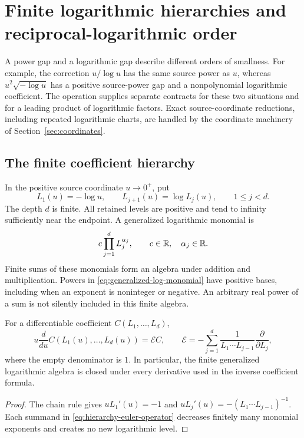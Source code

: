 \section{Finite logarithmic hierarchies and reciprocal-logarithmic order}
\label{sec:logarithmic-scales}

A power gap and a logarithmic gap describe different orders of smallness.
For example, the correction $u/\log u$ has the same source power as $u$,
whereas $u^2\sqrt{-\log u}$ has a positive source-power gap and a
nonpolynomial logarithmic coefficient. The operation
 supplies separate contracts for these
two situations and for a leading product of logarithmic factors. Exact
source-coordinate reductions, including repeated logarithmic charts, are
handled by the coordinate machinery of Section~\ref{sec:coordinates}.

\subsection{The finite coefficient hierarchy}

In the positive source coordinate $u\to0^+$, put
\begin{equation}
 L_1(u)=-\log u,\qquad L_{j+1}(u)=\log L_j(u),
 \qquad 1\le j<d.
 \label{eq:logarithmic-hierarchy}
\end{equation}
The depth $d$ is finite. All retained levels are positive and tend to
infinity sufficiently near the endpoint. A generalized logarithmic
monomial is
\begin{equation}
 c\prod_{j=1}^d L_j^{\alpha_j},\qquad
 c\in\mathbb R,\quad \alpha_j\in\mathbb R.
 \label{eq:generalized-log-monomial}
\end{equation}
Finite sums of these monomials form an algebra under addition and
multiplication. Powers in \eqref{eq:generalized-log-monomial} have positive
bases, including when an exponent is noninteger or negative. An arbitrary
real power of a sum is not silently included in this finite algebra.

\begin{proposition}
\label{prop:logarithmic-euler-closure}
For a differentiable coefficient $C(L_1,\ldots,L_d)$,
\begin{equation}
 u\frac{d}{du}C(L_1(u),\ldots,L_d(u))
 =\mathcal E C,
 \qquad
 \mathcal E=-\sum_{j=1}^d
 \frac{1}{L_1\cdots L_{j-1}}\frac{\partial}{\partial L_j},
 \label{eq:hierarchy-euler-operator}
\end{equation}
where the empty denominator is $1$. In particular, the finite generalized
logarithmic algebra is closed under every derivative used in the inverse
coefficient formula.
\end{proposition}
\begin{proof}
The chain rule gives $uL_1'(u)=-1$ and
$uL_j'(u)=-(L_1\cdots L_{j-1})^{-1}$. Each summand in
\eqref{eq:hierarchy-euler-operator} decreases finitely many monomial
exponents and creates no new logarithmic level.
\end{proof}

